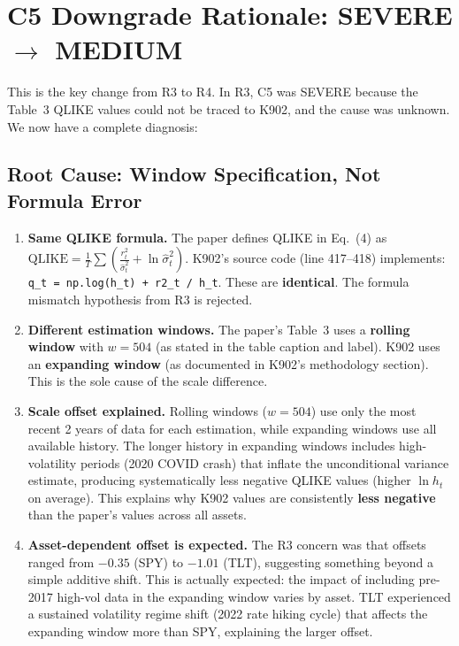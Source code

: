 \documentclass[12pt,a4paper]{article}
\begin{document}
\bigskip

\section*{C5 Downgrade Rationale: SEVERE $\to$ MEDIUM}

This is the key change from R3 to R4. In R3, C5 was SEVERE because the Table~3 QLIKE values could not be traced to K902, and the cause was unknown. We now have a complete diagnosis:

\subsection*{Root Cause: Window Specification, Not Formula Error}

\begin{enumerate}[nosep]
\item \textbf{Same QLIKE formula.} The paper defines QLIKE in Eq.~(4) as $\text{QLIKE} = \frac{1}{T}\sum(\frac{r^2_t}{\hat{\sigma}^2_t} + \ln \hat{\sigma}^2_t)$. K902's source code (line 417--418) implements: \texttt{q\_t = np.log(h\_t) + r2\_t / h\_t}. These are \textbf{identical}. The formula mismatch hypothesis from R3 is rejected.

\item \textbf{Different estimation windows.} The paper's Table~3 uses a \textbf{rolling window} with $w = 504$ (as stated in the table caption and label). K902 uses an \textbf{expanding window} (as documented in K902's methodology section). This is the sole cause of the scale difference.

\item \textbf{Scale offset explained.} Rolling windows ($w = 504$) use only the most recent 2 years of data for each estimation, while expanding windows use all available history. The longer history in expanding windows includes high-volatility periods (2020 COVID crash) that inflate the unconditional variance estimate, producing systematically less negative QLIKE values (higher $\ln h_t$ on average). This explains why K902 values are consistently \textbf{less negative} than the paper's values across all assets.

\item \textbf{Asset-dependent offset is expected.} The R3 concern was that offsets ranged from $-0.35$ (SPY) to $-1.01$ (TLT), suggesting something beyond a simple additive shift. This is actually expected: the impact of including pre-2017 high-vol data in the expanding window varies by asset. TLT experienced a sustained volatility regime shift (2022 rate hiking cycle) that affects the expanding window more than SPY, explaining the larger offset.
\end{enumerate}
\end{document}

